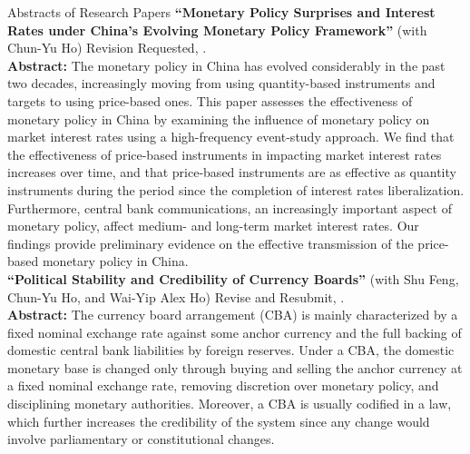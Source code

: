 \documentclass{resume_liang} %
\begin{document}
\newpage
\begin{rSection}{Abstracts of Research Papers}
	\textbf{``Monetary Policy Surprises and Interest Rates under China's Evolving Monetary Policy Framework''} (with Chun-Yu Ho) Revision Requested, \textit{}.\vspace{0.1cm}\\ 
	\textbf{Abstract:} The monetary policy in China has evolved considerably in the past two decades, increasingly moving from using quantity-based instruments and targets to using price-based ones. This paper assesses the effectiveness of monetary policy in China by examining the influence of monetary policy on market interest rates using a high-frequency event-study approach. We find that the effectiveness of price-based instruments in impacting market interest rates increases over time, and that price-based instruments are as effective as quantity instruments during the period since the completion of interest rates liberalization. Furthermore, central bank communications, an increasingly important aspect of monetary policy, affect medium- and long-term market interest rates. Our findings provide preliminary evidence on the effective transmission of the price-based monetary policy in China. \\
	
	\textbf{``Political Stability and Credibility of Currency Boards''} (with Shu Feng, Chun-Yu Ho, and Wai-Yip Alex Ho) Revise and Resubmit, \textit{}.\vspace{0.1cm}\\
	\textbf{Abstract:} The currency board arrangement (CBA) is mainly characterized by a fixed nominal exchange rate against some anchor currency and the full backing of domestic central bank liabilities by foreign reserves. Under a CBA, the domestic monetary base is changed only through buying and selling the anchor currency at a fixed nominal exchange rate, removing discretion over monetary policy, and disciplining monetary authorities. Moreover, a CBA is usually codified in a law, which further increases the credibility of the system since any change would involve parliamentary or constitutional changes.  
	

\end{rSection}
\end{document}
